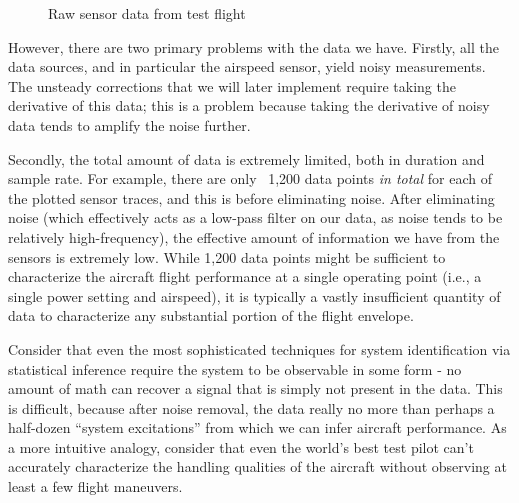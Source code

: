 \documentclass[conf]{new-aiaa}
\begin{document}
    \begin{figure}[!htb]
        \centering
        \caption{Raw sensor data from test flight}
        \label{fig:raw_flight_data}
    \end{figure}


    However, there are two primary problems with the data we have. Firstly, all the data sources, and in particular the airspeed sensor, yield noisy measurements. The unsteady corrections that we will later implement require taking the derivative of this data; this is a problem because taking the derivative of noisy data tends to amplify the noise further.

    Secondly, the total amount of data is extremely limited, both in duration and sample rate. For example, there are only ~1,200 data points \emph{in total} for each of the plotted sensor traces, and this is before eliminating noise. After eliminating noise (which effectively acts as a low-pass filter on our data, as noise tends to be relatively high-frequency), the effective amount of information we have from the sensors is extremely low. While 1,200 data points might be sufficient to characterize the aircraft flight performance at a single operating point (i.e., a single power setting and airspeed), it is typically a vastly insufficient quantity of data to characterize any substantial portion of the flight envelope.

    Consider that even the most sophisticated techniques for system identification via statistical inference require the system to be observable in some form - no amount of math can recover a signal that is simply not present in the data. This is difficult, because after noise removal, the data really no more than perhaps a half-dozen ``system excitations'' from which we can infer aircraft performance. As a more intuitive analogy, consider that even the world's best test pilot can't accurately characterize the handling qualities of the aircraft without observing at least a few flight maneuvers.
\end{document}
